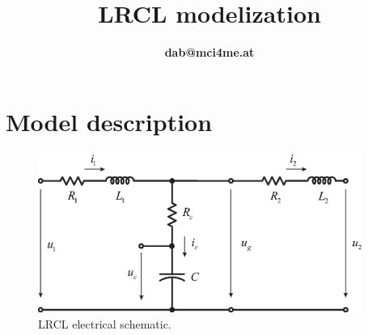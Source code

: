 \documentclass[11pt,a4paper]{article}
\title{\textbf{LRCL modelization}}
\author{\textbf{dab@mci4me.at}}
\numberwithin{equation}{section}
\theoremstyle{it}
\theoremstyle{definition}
\begin{document}
	\thispagestyle{firstpage}
	\begin{mybox}
		\maketitle
		\vspace{125mm}
	\end{mybox}
	\newpage
	\tableofcontents
	\listoffigures	
	\listoftables
	\newpage

\section{Model description}

\begin{figure}[H]
	\centering
		\includegraphics[width = 300pt, angle = 0, 
		keepaspectratio]{figures/electric_schematic_LRCL_filter_2.eps}
		\captionsetup{width=0.5\textwidth}	
		\caption{LRCL electrical schematic.}
	\label{lrcl_fig1}
\end{figure}
\end{document}
